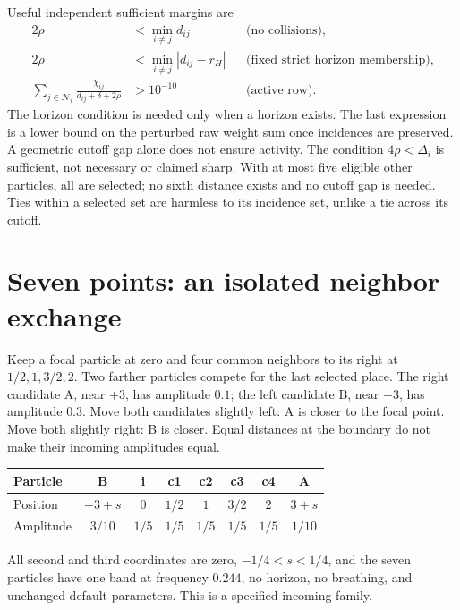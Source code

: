 \documentclass[11pt,a4paper]{article}
\theoremstyle{remark}\newtheorem{remark}[theorem]{Remark}
\numberwithin{equation}{section}
\begin{document}
Useful independent sufficient margins are
\begin{align}
2\rho&<\min_{i\ne j}d_{ij}
&&\text{(no collisions)},\label{eq:collision}\\
2\rho&<\min_{i\ne j}|d_{ij}-r_H|
&&\text{(fixed strict horizon membership)},\label{eq:horizon}\\
\sum_{j\in\mathcal N_i}
\frac{\chi_{ij}}{d_{ij}+\delta+2\rho}&>10^{-10}
&&\text{(active row)}.\label{eq:guard}
\end{align}
The horizon condition is needed only when a horizon exists.
The last expression is a lower bound on the perturbed raw weight sum
once incidences are preserved. A geometric cutoff gap alone does not
ensure activity.
The condition $4\rho<\Delta_i$ is sufficient, not necessary or claimed sharp.
With at most five eligible other particles, all are selected; no sixth
distance exists and no cutoff gap is needed. Ties within a selected set
are harmless to its incidence set, unlike a tie across its cutoff.

\section{Seven points: an isolated neighbor exchange}\label{sec:seven}

Keep a focal particle at zero and four common neighbors to its right at
$1/2,1,3/2,2$. Two farther particles compete for the last selected place.
The right candidate A, near $+3$, has amplitude $0.1$; the left candidate B,
near $-3$, has amplitude $0.3$. Move both candidates slightly left: A is
closer to the focal point. Move both slightly right: B is closer.
Equal distances at the boundary do not make their incoming amplitudes equal.

\begin{center}
\begin{tabular}{@{}lccccccc@{}}
\toprule
Particle & B & i & c1 & c2 & c3 & c4 & A\\
\midrule
Position & $-3+s$ & $0$ & $1/2$ & $1$ & $3/2$ & $2$ & $3+s$\\
Amplitude & $3/10$ & $1/5$ & $1/5$ & $1/5$ & $1/5$ & $1/5$ & $1/10$\\
\bottomrule
\end{tabular}
\end{center}

All second and third coordinates are zero, $-1/4<s<1/4$, and the seven
particles have one band at frequency $0.244$, no horizon, no breathing,
and unchanged default parameters. This is a specified incoming family.
\end{document}
